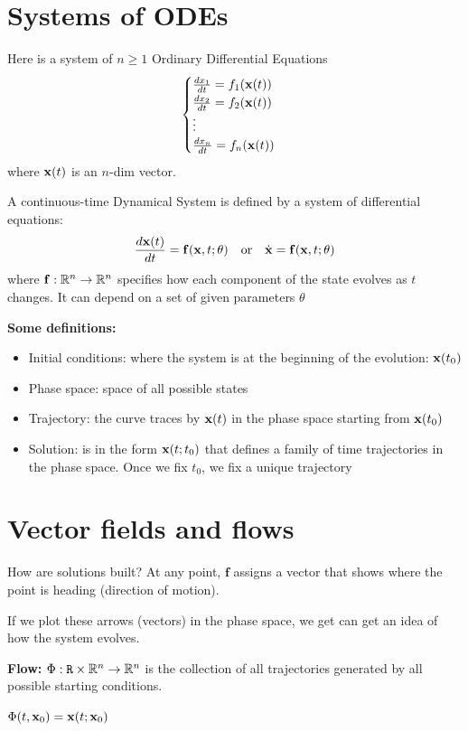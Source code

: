 \documentclass{report}
\begin{document}
\section*{Systems of ODEs}

Here is a system of $n \ge 1$ Ordinary Differential Equations
\[
\begin{cases}
\frac{dx_1}{dt} = f_1(\mathbf{x}(t))\\
\frac{dx_2}{dt} = f_2(\mathbf{x}(t))\\
\vdots \\ 
\frac{dx_n}{dt} = f_n(\mathbf{x}(t))
\end{cases}
\]
where $\mathbf{x}(t)$ is an $n$-dim vector.


A continuous-time Dynamical System is defined by a system of differential equations:
\[
\frac{d\mathbf{x}(t)}{dt} = \mathbf{f}(\mathbf{x}, t; \theta) \quad \text{or} \quad \dot{\mathbf{x}} = \mathbf{f}(\mathbf{x}, t; \theta)
\]
where $\mathbf{f}: \mathbb{R}^n \to \mathbb{R}^n$ specifies how each component of the state evolves as $t$ changes.
It can depend on a set of given parameters $\theta$

\textbf{Some definitions:}

\begin{itemize}
    \item Initial conditions: where the system is at the beginning of the evolution:
    $\mathbf{x}(t_0)$
    \item Phase space: space of all possible states 
    \item Trajectory: the curve traces by $\mathbf{x}(t)$ in the phase space starting from $\mathbf{x}(t_0)$
    \item Solution: is in the form $\mathbf{x}(t; t_0)$ that defines a family of time trajectories 
    in the phase space. Once we fix $t_0$, we fix a unique trajectory
\end{itemize}

\section*{Vector fields and flows}
How are solutions built? At any point, $\mathbf{f}$ assigns a vector 
that shows where the point is heading (direction of motion).

If we plot these arrows (vectors) in the phase space, we get can 
get an idea of how the system evolves. 

\textbf{Flow: } $\Phi: \mathtt{R} \times \mathbb{R}^n \to \mathbb{R}^n$ is the collection of 
all trajectories generated by all possible starting conditions. 

$\Phi(t, \mathbf{x}_0) = \mathbf{x}(t; \mathbf{x}_0)$
\end{document}
